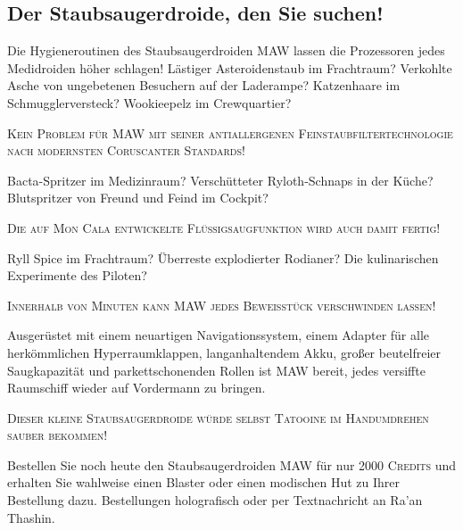 \documentclass[final]{multiversum}
\begin{document}
\subsection{Der Staubsaugerdroide, den Sie suchen!}

Die Hygieneroutinen des Staubsaugerdroiden MAW lassen die Prozessoren jedes Medidroiden höher schlagen!
Lästiger Asteroidenstaub im Frachtraum?
Verkohlte Asche von ungebetenen Besuchern auf der Laderampe?
Katzenhaare im Schmugglerversteck? Wookieepelz im Crewquartier?\\
\begin{center}\textsc{Kein Problem für MAW mit seiner antiallergenen Feinstaubfiltertechnologie nach modernsten Coruscanter Standards!}\\\end{center}
Bacta-Spritzer im Medizinraum?
Verschütteter Ryloth-Schnaps in der Küche?
Blutspritzer von Freund und Feind im Cockpit?\\
\begin{center}\textsc{Die auf Mon Cala entwickelte Flüssigsaugfunktion wird auch damit fertig!}\\\end{center}
Ryll Spice im Frachtraum?
Überreste explodierter Rodianer?
Die kulinarischen Experimente des Piloten?
\begin{center}\textsc{Innerhalb von Minuten kann MAW jedes Beweisstück verschwinden lassen!}\\\end{center}
Ausgerüstet mit einem neuartigen Navigationssystem, einem Adapter für alle herkömmlichen Hyperraumklappen, langanhaltendem Akku, großer beutelfreier Saugkapazität und parkettschonenden Rollen ist MAW bereit, jedes versiffte Raumschiff wieder auf Vordermann zu bringen.
\begin{center}\textsc{Dieser kleine Staubsaugerdroide würde selbst Tatooine im Handumdrehen sauber bekommen!}\\\end{center}
Bestellen Sie noch heute den Staubsaugerdroiden MAW für nur \textsc{2000 Credits} und erhalten Sie wahlweise einen Blaster oder einen modischen Hut zu Ihrer Bestellung dazu. 
Bestellungen holografisch oder per Textnachricht an Ra'an Thashin.\\
\end{document}
